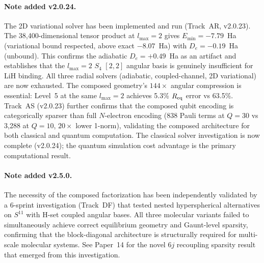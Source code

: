 \documentclass[aps,pra,twocolumn,superscriptaddress,longbibliography,floatfix]{revtex4-2}
\begin{document}
\paragraph{Note added v2.0.24.}
The 2D variational solver has been implemented and run (Track~AR,
v2.0.23).  The 38{,}400-dimensional tensor product at $l_{\max} = 2$
gives $E_{\min} = -7.79$~Ha (variational bound respected, above
exact $-8.07$~Ha) with $D_e = -0.19$~Ha (unbound).  This confirms
the adiabatic $D_e = +0.49$~Ha as an artifact and establishes that
the $l_{\max} = 2$ $S_4$ $[2,2]$ angular basis is genuinely
insufficient for LiH binding.  All three radial solvers (adiabatic,
coupled-channel, 2D variational) are now exhausted.  The composed
geometry's $144{\times}$ angular compression is essential: Level~5 at
the same $l_{\max} = 2$ achieves 5.3\% $R_{\rm eq}$ error vs
63.5\%.  Track~AS (v2.0.23) further confirms that the composed
qubit encoding is categorically sparser than full $N$-electron
encoding (838 Pauli terms at $Q = 30$ vs 3{,}288 at $Q = 10$,
$20{\times}$ lower 1-norm),
validating the composed architecture for both classical and quantum
computation.  The classical solver investigation is now complete
(v2.0.24); the quantum simulation cost advantage is the primary
computational result.

\paragraph{Note added v2.5.0.}
The necessity of the composed factorization has been independently
validated by a 6-sprint investigation (Track~DF) that tested nested
hyperspherical alternatives on $S^{11}$ with H-set coupled angular
bases.  All three molecular variants failed to simultaneously achieve
correct equilibrium geometry and Gaunt-level sparsity, confirming that
the block-diagonal architecture is structurally required for
multi-scale molecular systems.  See Paper~14 for the novel 6$j$
recoupling sparsity result that emerged from this investigation.
\end{document}
